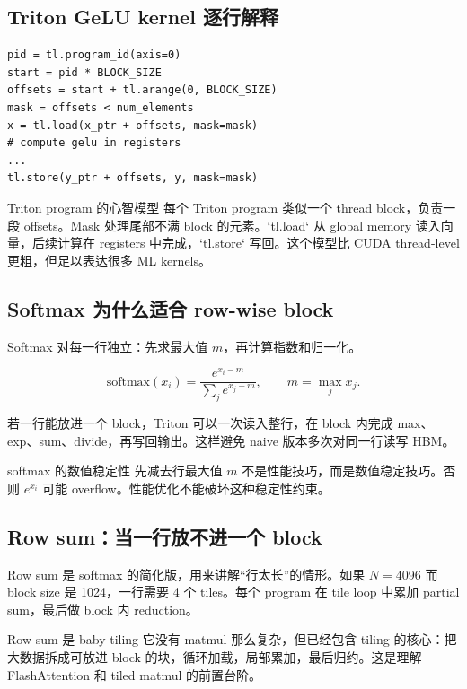 \subsection{Triton GeLU kernel 逐行解释}

\begin{lstlisting}[caption={Triton GeLU kernel 核心结构}]
pid = tl.program_id(axis=0)
start = pid * BLOCK_SIZE
offsets = start + tl.arange(0, BLOCK_SIZE)
mask = offsets < num_elements
x = tl.load(x_ptr + offsets, mask=mask)
# compute gelu in registers
...
tl.store(y_ptr + offsets, y, mask=mask)
\end{lstlisting}

\begin{knowledgebox}{Triton program 的心智模型}
每个 Triton program 类似一个 thread block，负责一段 offsets。Mask 处理尾部不满 block 的元素。`tl.load` 从 global memory 读入向量，后续计算在 registers 中完成，`tl.store` 写回。这个模型比 CUDA thread-level 更粗，但足以表达很多 ML kernels。
\end{knowledgebox}

\subsection{Softmax 为什么适合 row-wise block}

Softmax 对每一行独立：先求最大值 \(m\)，再计算指数和归一化。

\[
\mathrm{softmax}(x_i)=\frac{e^{x_i-m}}{\sum_j e^{x_j-m}},\qquad m=\max_j x_j.
\]

若一行能放进一个 block，Triton 可以一次读入整行，在 block 内完成 max、exp、sum、divide，再写回输出。这样避免 naive 版本多次对同一行读写 HBM。

\begin{warningbox}{softmax 的数值稳定性}
先减去行最大值 \(m\) 不是性能技巧，而是数值稳定技巧。否则 \(e^{x_i}\) 可能 overflow。性能优化不能破坏这种稳定性约束。
\end{warningbox}

\subsection{Row sum：当一行放不进一个 block}

Row sum 是 softmax 的简化版，用来讲解“行太长”的情形。如果 \(N=4096\) 而 block size 是 1024，一行需要 4 个 tiles。每个 program 在 tile loop 中累加 partial sum，最后做 block 内 reduction。

\begin{importantbox}{Row sum 是 baby tiling}
它没有 matmul 那么复杂，但已经包含 tiling 的核心：把大数据拆成可放进 block 的块，循环加载，局部累加，最后归约。这是理解 FlashAttention 和 tiled matmul 的前置台阶。
\end{importantbox}

